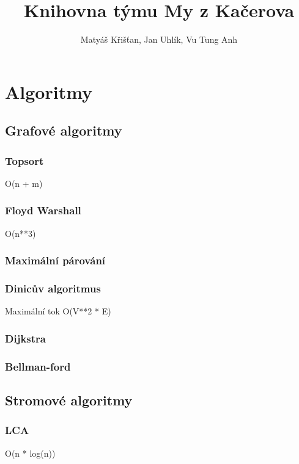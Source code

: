 \documentclass[10pt, a4paper, twoside]{article}
\title{Knihovna týmu My z Kačerova}
\author{Matyáš Křišťan, Jan Uhlík, Vu Tung Anh}
\begin{document}
\tableofcontents

\section{Algoritmy}
\subsection{Grafové algoritmy}

\subsubsection{Topsort}
O(n + m)


\subsubsection{Floyd Warshall}
O(n**3)


\subsubsection{Maximální párování}


\subsubsection{Dinicův algoritmus}
Maximální tok O(V**2 * E)


\subsubsection{Dijkstra}


\subsubsection{Bellman-ford}


\subsection{Stromové algoritmy}
\subsubsection{LCA}
O(n * log(n))

\end{document}
